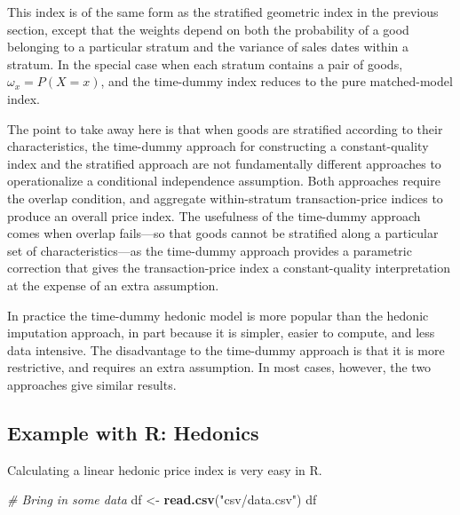 \documentclass[]{article}
\newenvironment{Shaded}{\begin{snugshade}}{\end{snugshade}}
\newcommand{\CommentTok}[1]{\textcolor[rgb]{0.56,0.35,0.01}{\textit{#1}}}
\newcommand{\KeywordTok}[1]{\textcolor[rgb]{0.13,0.29,0.53}{\textbf{#1}}}
\newcommand{\NormalTok}[1]{#1}
\newcommand{\StringTok}[1]{\textcolor[rgb]{0.31,0.60,0.02}{#1}}
\begin{document}
This index is of the same form as the stratified geometric index in the previous section, except that the weights depend on both the probability of a good belonging to a particular stratum and the variance of sales dates within a stratum. In the special case when each stratum contains a pair of goods, \(\omega_{x} = P(X = x)\), and the time-dummy index reduces to the pure matched-model index.

The point to take away here is that when goods are stratified according to their characteristics, the time-dummy approach for constructing a constant-quality index and the stratified approach are not fundamentally different approaches to operationalize a conditional independence assumption. Both approaches require the overlap condition, and aggregate within-stratum transaction-price indices to produce an overall price index. The usefulness of the time-dummy approach comes when overlap fails---so that goods cannot be stratified along a particular set of characteristics---as the time-dummy approach provides a parametric correction that gives the transaction-price index a constant-quality interpretation at the expense of an extra assumption.

In practice the time-dummy hedonic model is more popular than the hedonic imputation approach, in part because it is simpler, easier to compute, and less data intensive. The disadvantage to the time-dummy approach is that it is more restrictive, and requires an extra assumption. In most cases, however, the two approaches give similar results.

\hypertarget{example-with-r-hedonics}{%
\subsection{Example with R: Hedonics}\label{example-with-r-hedonics}}

Calculating a linear hedonic price index is very easy in R.

\begin{Shaded}
\begin{Highlighting}[]
\CommentTok{# Bring in some data}
\NormalTok{df <-}\StringTok{ }\KeywordTok{read.csv}\NormalTok{(}\StringTok{"csv/data.csv"}\NormalTok{)}
\NormalTok{df}
\end{Highlighting}
\end{Shaded}
\end{document}
